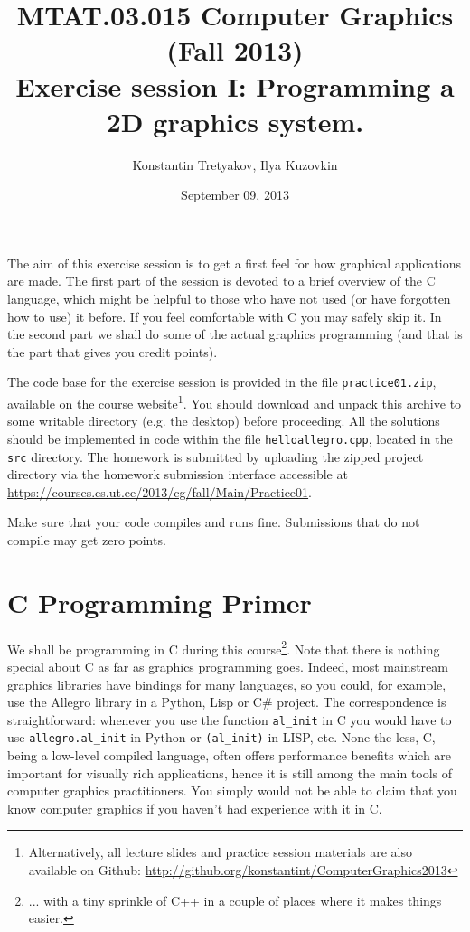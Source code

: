 \documentclass{article}
\begin{document}
\title{MTAT.03.015 Computer Graphics (Fall 2013)\\
Exercise session I: Programming a 2D graphics system.}
\author{Konstantin Tretyakov, Ilya Kuzovkin}
\date{September 09, 2013}
\maketitle

The aim of this exercise session is to get a first feel for how graphical applications are made. The first part of the session is devoted to a brief overview of the C language, which might be helpful to those who have not used (or have forgotten how to use) it before. If you feel comfortable with C you may safely skip it. In the second part we shall do some of the actual graphics programming (and that is the part that gives you credit points).

The code base for the exercise session is provided in the file \texttt{practice01.zip}, available on the course website\footnote{Alternatively, all lecture slides and practice session materials are also available on Github: \url{http://github.org/konstantint/ComputerGraphics2013}}. You should download and unpack this archive to some writable directory (e.g. the desktop) before proceeding. All the solutions should be implemented in code within the file \texttt{helloallegro.cpp}, located in the \texttt{src} directory. The homework is submitted by uploading the zipped project directory via the homework submission interface accessible at \url{https://courses.cs.ut.ee/2013/cg/fall/Main/Practice01}.

Make sure that your code compiles and runs fine. Submissions that do not compile may get zero points.


\section{C Programming Primer}

We shall be programming in C during this course\footnote{... with a tiny sprinkle of C++ in a couple of places where it makes things easier.}. Note that there is nothing special about C as far as graphics programming goes. Indeed, most mainstream graphics libraries have bindings for many languages, so you could, for example, use the Allegro library in a Python, Lisp or C\# project. The correspondence is straightforward: whenever you use the function \verb#al_init# in C you would have to use \verb#allegro.al_init# in Python or \verb#(al_init)# in LISP, etc. None the less, C, being a low-level compiled language, often offers performance benefits which are important for visually rich applications, hence it is still among the main tools of computer graphics practitioners. You simply would not be able to claim that you know computer graphics if you haven't had experience with it in C.
\end{document}

